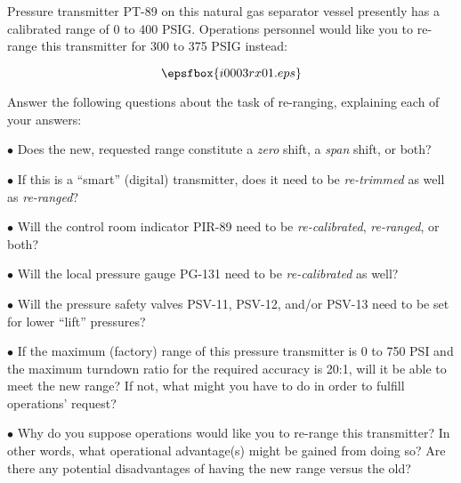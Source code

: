 

Pressure transmitter PT-89 on this natural gas separator vessel presently has a calibrated range of 0 to 400 PSIG.  Operations personnel would like you to re-range this transmitter for 300 to 375 PSIG instead:

$$\epsfbox{i0003rx01.eps}$$

Answer the following questions about the task of re-ranging, explaining each of your answers:

\medskip
\item{$\bullet$} Does the new, requested range constitute a {\it zero} shift, a {\it span} shift, or both?
\vskip 10pt
\item{$\bullet$} If this is a ``smart'' (digital) transmitter, does it need to be {\it re-trimmed} as well as {\it re-ranged}?
\vskip 10pt
\item{$\bullet$} Will the control room indicator PIR-89 need to be {\it re-calibrated}, {\it re-ranged}, or both?
\vskip 10pt
\item{$\bullet$} Will the local pressure gauge PG-131 need to be {\it re-calibrated} as well?
\vskip 10pt
\item{$\bullet$} Will the pressure safety valves PSV-11, PSV-12, and/or PSV-13 need to be set for lower ``lift'' pressures?
\vskip 10pt
\item{$\bullet$} If the maximum (factory) range of this pressure transmitter is 0 to 750 PSI and the maximum turndown ratio for the required accuracy is 20:1, will it be able to meet the new range?  If not, what might you have to do in order to fulfill operations' request?
\vskip 10pt
\item{$\bullet$} Why do you suppose operations would like you to re-range this transmitter?  In other words, what operational advantage(s) might be gained from doing so?  Are there any potential disadvantages of having the new range versus the old?
\medskip














